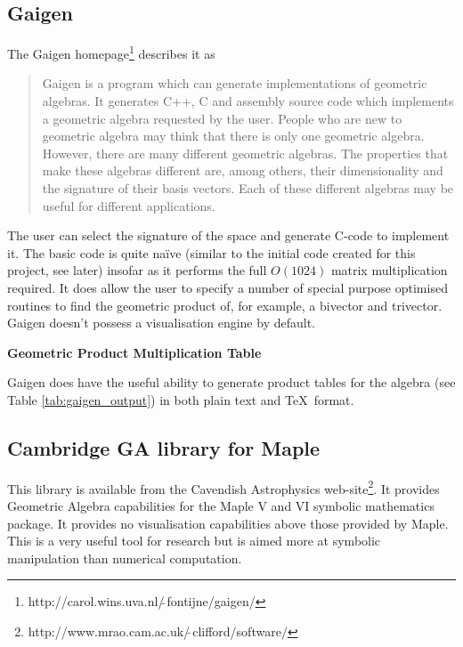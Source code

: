 \subsection{Gaigen}
The Gaigen 
homepage\footnote{http://carol.wins.uva.nl/$\tilde{\ }$fontijne/gaigen/} describes 
it as
\begin{quote}
Gaigen is a program which can generate implementations of geometric algebras. It generates C++, C and assembly source code which implements a geometric algebra requested by the user. People who are new to geometric algebra may think that there is only one geometric algebra. However, there are many different geometric algebras. The properties that make these algebras different are, among others, their dimensionality and the signature of their basis vectors. Each of these different algebras may be useful for different applications.
\end{quote}
The user can select the signature of the space and generate C-code to implement it. The
basic code is quite na\"ive (similar to the initial code created for
this project, see later) insofar as it
performs the full $O(1024)$ matrix multiplication required. It does allow the
user to specify a number of special purpose optimised routines to
find the geometric product of, for example, a bivector and trivector.
Gaigen doesn't possess a visualisation engine by default.

\begin{table}
\centering
\textbf{Geometric Product Multiplication Table}\\
\rule{0cm}{0.3cm}

\caption{Example \TeX\ output from Gaigen\label{tab:gaigen_output}}
\end{table}

Gaigen does have the useful ability to generate product tables for the algebra
(see Table \ref{tab:gaigen_output}) in both plain text and \TeX\ format. 

\subsection{Cambridge GA library for Maple}
This library is available from the Cavendish Astrophysics
web-site\footnote{http://www.mrao.cam.ac.uk/$\tilde{\ }$clifford/software/}. It
provides Geometric Algebra capabilities for the Maple V and VI symbolic mathematics
package. It provides no visualisation capabilities above those provided by
Maple. This is a very useful tool for research but is aimed more at symbolic
manipulation than numerical computation.
